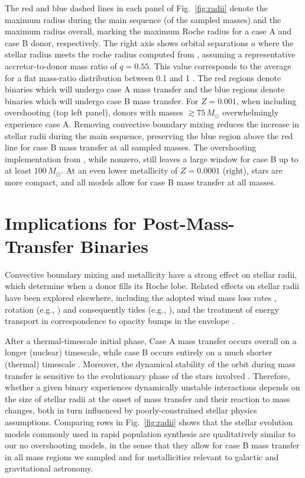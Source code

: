 \documentclass[twocolumn]{aastex63}
\DeclareRobustCommand{\Figref}[1]{Fig.~\ref{#1}}
\begin{document}
The red and blue dashed lines in each panel of \Figref{fig:radii}
denote the maximum radius during the main sequence (of the sampled masses) and the maximum
radius overall, marking the maximum Roche radius for a case A and case
B donor, respectively. The right axis shows orbital separations $a$
where the stellar radius meets the roche radius computed from
\citet{eggleton:83}, assuming a representative accretor-to-donor mass
ratio of $q=0.55$. This value corresponds to the average for a flat
mass-ratio distribution between 0.1 and 1
\citep{kobulnicky:07,sana:12}. The red regions denote binaries which
will undergo case A mass transfer and the blue regions denote binaries
which will undergo case B mass transfer. For $Z=0.001$, when including
overshooting (top left panel), donors with masses
$ \gtrsim 75 \, M_{\odot}$ overwhelmingly experience case A.  Removing
convective boundary mixing reduces the increase in stellar radii
during the main sequence, preserving the blue region above the red
line for case B mass transfer at all sampled masses. The overshooting
implementation from \cite{pols:98}, while nonzero, still leaves a
large window for case B up to at least $100 \, M_{\odot}$. At an even
lower metallicity of $Z=0.0001$ (right), stars are more compact, and
all models allow for case B mass transfer at all masses.

\section{Implications for Post-Mass-Transfer Binaries}

Convective boundary mixing \citep{brott:11, johnston:24} and
metallicity \citep[e.g.,][]{xin:22} have a strong effect on stellar
radii, which determine when a donor fills its Roche lobe. Related
effects on stellar radii have been explored elsewhere, including the
adopted wind mass loss rates \citep[e.g.,][]{smith:14, renzo:17,
  josiek:24}, rotation (e.g., \citealt{maeder:00}) and consequently
tides (e.g., \citealt{fabry:22}), and the treatment of energy
transport in correspondence to opacity bumps in the envelope
\citep[e.g.,][]{joss:73, agrawal:22, cheng:24}.

After a thermal-timescale initial phase, Case A mass transfer occurs
overall on a longer (nuclear) timescale, while case B occurs entirely
on a much shorter (thermal) timescale \citep[but see][]{klencki:22}.
Moreover, the dynamical stability of the orbit during mass transfer is
sensitive to the evolutionary phase of the stars involved
\citep[e.g.,][]{claeys:14}. Therefore, whether a given binary
experiences dynamically unstable interactions depends on the size of
stellar radii at the onset of mass transfer and their reaction to mass
changes, both in turn influenced by poorly-constrained stellar physics
assumptions. Comparing rows in \Figref{fig:radii} shows that the
stellar evolution models commonly used in rapid population synthesis
are qualitatively similar to our no overshooting models, in the sense
that they allow for case B mass transfer in all mass regions we
sampled and for metallicities relevant to galactic and gravitational
astronomy.
\end{document}
